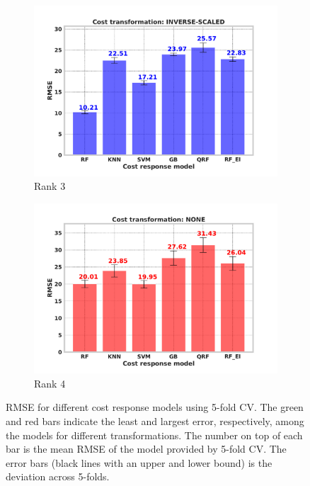 {\begin{figure}[!h]
\begin{subfigure}{.47\textwidth}
              \includegraphics[width=\textwidth]{images/rmse-cost_3.pdf}
              \caption{Rank 3}
        \end{subfigure}
        \begin{subfigure}{.47\textwidth}
              \centering
              \includegraphics[width=\textwidth]{images/rmse-cost_0.pdf}
              \caption{Rank 4}
            \end{subfigure}
\captionsetup{justification=justified}
\caption[RMSE for cost response models]{RMSE for different cost response models using 5-fold CV. The green and red bars indicate the least and largest error, respectively, among the models for different transformations. The number on top of each bar is the mean RMSE of the model provided by 5-fold CV\footnotemark. The error bars (black lines with an upper and lower bound) is the deviation across 5-folds.}
\label{fig:cost_response_result}
\end{figure}
}

